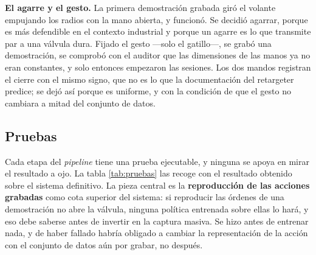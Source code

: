 \textbf{El agarre y el gesto.} La primera demostración grabada giró el volante empujando los
radios con la mano abierta, y funcionó. Se decidió agarrar, porque es más defendible en el contexto
industrial y porque un agarre es lo que transmite par a una válvula dura. Fijado el gesto —solo el
gatillo—, se grabó una demostración, se comprobó con el auditor que las dimensiones de las manos ya
no eran constantes, y solo entonces empezaron las sesiones. Los dos mandos registran el cierre con
el mismo signo, que no es lo que la documentación del retargeter predice; se dejó así porque es
uniforme, y con la condición de que el gesto no cambiara a mitad del conjunto de datos.


\subsection{Pruebas}

Cada etapa del \textit{pipeline} tiene una prueba ejecutable, y ninguna se apoya en mirar el resultado a
ojo. La tabla \ref{tab:pruebas} las recoge con el resultado obtenido sobre el sistema definitivo.
La pieza central es la \textbf{reproducción de las acciones grabadas} como cota superior del
sistema: si reproducir las órdenes de una demostración no abre la válvula, ninguna política
entrenada sobre ellas lo hará, y eso debe saberse antes de invertir en la captura masiva. Se hizo
antes de entrenar nada, y de haber fallado habría obligado a cambiar la representación de la
acción con el conjunto de datos aún por grabar, no después.


